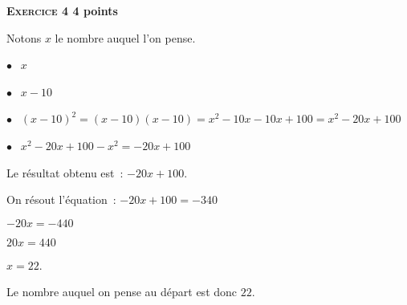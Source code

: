\textbf{\textsc{Exercice 4} \hfill 4 points}

\medskip

%
Notons $x$ le nombre auquel l'on pense.

$\bullet~~$	$x$

$\bullet~~$	$x - 10$

$\bullet~~$	$(x - 10)^2 = (x - 10)(x - 10) = x^2 - 10x - 10x + 100 = x^2 - 20x + 100$

$\bullet~~$	$x^2 - 20x + 100 - x^2 = - 20x + 100$

Le résultat obtenu est : $- 20x + 100$.

On résout l'équation :	$- 20x + 100	=	- 340$

				$- 20x	=	-440$
				
				$20x	=	440$
				
				$x	=	22$.
				
Le nombre auquel on pense au départ est donc $22$.
\vspace{0,5cm}

